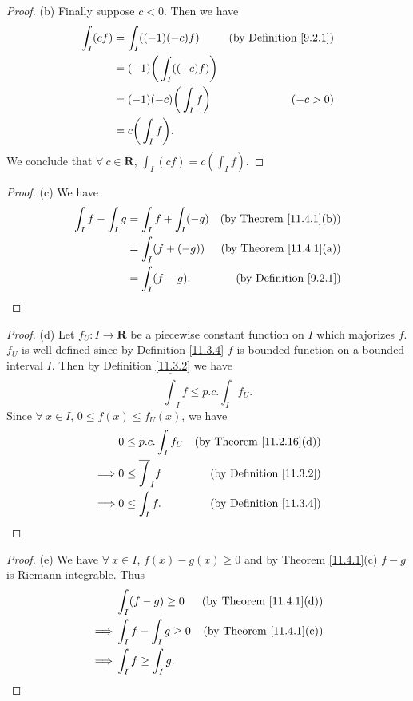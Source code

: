 \begin{proof}{(b)}
    Finally suppose \(c < 0\).
    Then we have
    \begin{align*}
        \int_I (cf) & = \int_I ((-1)(-c)f)              & \text{(by Definition \ref{9.2.1})} \\
                    & = (-1) \bigg(\int_I ((-c)f)\bigg)                                      \\
                    & = (-1)(-c) \bigg(\int_I f\bigg)   & (-c > 0)                           \\
                    & = c \bigg(\int_I f\bigg).
    \end{align*}
    We conclude that \(\forall\ c \in \mathbf{R}\), \(\int_I (cf) = c (\int_I f)\).
\end{proof}

\begin{proof}{(c)}
    We have
    \begin{align*}
        \int_I f - \int_I g & = \int_I f + \int_I (-g) & \text{(by Theorem \ref{11.4.1}(b))} \\
                            & = \int_I (f + (-g))      & \text{(by Theorem \ref{11.4.1}(a))} \\
                            & = \int_I (f - g).        & \text{(by Definition \ref{9.2.1})}
    \end{align*}
\end{proof}

\begin{proof}{(d)}
    Let \(f_U : I \to \mathbf{R}\) be a piecewise constant function on \(I\) which majorizes \(f\).
    \(f_U\) is well-defined since by Definition \ref{11.3.4} \(f\) is bounded function on a bounded interval \(I\).
    Then by Definition \ref{11.3.2} we have
    \[
        \overline{\int}_I f \leq p.c. \int_I f_U.
    \]
    Since \(\forall\ x \in I\), \(0 \leq f(x) \leq f_U(x)\), we have
    \begin{align*}
                 & 0 \leq p.c. \int_I f_U     & \text{(by Theorem \ref{11.2.16}(d))} \\
        \implies & 0 \leq \overline{\int}_I f & \text{(by Definition \ref{11.3.2})}  \\
        \implies & 0 \leq \int_I f.           & \text{(by Definition \ref{11.3.4})}
    \end{align*}
\end{proof}

\begin{proof}{(e)}
    We have \(\forall\ x \in I\), \(f(x) - g(x) \geq 0\) and by Theorem \ref{11.4.1}(c) \(f - g\) is Riemann integrable.
    Thus
    \begin{align*}
                 & \int_I (f - g) \geq 0      & \text{(by Theorem \ref{11.4.1}(d))} \\
        \implies & \int_I f - \int_I g \geq 0 & \text{(by Theorem \ref{11.4.1}(c))} \\
        \implies & \int_I f \geq \int_I g.
    \end{align*}
\end{proof}